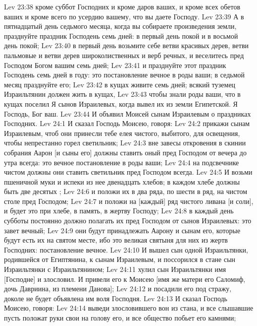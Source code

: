 \vs Lev 23:38 кроме суббот Господних и кроме даров ваших, и кроме всех обетов ваших и кроме всего  по усердию вашему, что вы даете Господу.
\vs Lev 23:39 А в пятнадцатый день седьмого месяца, когда вы собираете произведения земли, празднуйте праздник Господень семь дней: в первый день покой и в восьмой день покой;
\vs Lev 23:40 в первый день возьмите себе ветви красивых дерев, ветви пальмовые и ветви дерев широколиственных и верб речных, и веселитесь пред Господом Богом вашим семь дней;
\vs Lev 23:41 и празднуйте этот праздник Господень семь дней в году: это постановление вечное в роды ваши; в седьмой месяц празднуйте его;
\vs Lev 23:42 в кущах живите семь дней; всякий туземец Израильтянин должен жить в кущах,
\vs Lev 23:43 чтобы знали роды ваши, что в кущах поселил Я сынов Израилевых, когда вывел их из земли Египетской. Я Господь, Бог ваш.
\vs Lev 23:44 И объявил Моисей сынам Израилевым о праздниках Господних.
\vs Lev 24:1 И сказал Господь Моисею, говоря:
\vs Lev 24:2 прикажи сынам Израилевым, чтоб они принесли тебе елея чистого, выбитого, для освещения, чтобы непрестанно горел светильник;
\vs Lev 24:3 вне завесы  откровения в скинии собрания Аарон [и сыны его] должны ставить оный пред Господом от вечера до утра всегда: это вечное постановление в роды ваши;
\vs Lev 24:4 на подсвечнике чистом должны они ставить светильник пред Господом всегда.
\vs Lev 24:5 И возьми пшеничной муки и испеки из нее двенадцать хлебов; в каждом хлебе должны быть две десятых ;
\vs Lev 24:6 и положи их в два ряда, по шести в ряд, на чистом столе пред Господом;
\vs Lev 24:7 и положи на [каждый] ряд чистого ливана [и соли], и будет это при хлебе, в память, в жертву Господу;
\vs Lev 24:8 в каждый день субботы постоянно должно полагать их пред Господом от сынов Израилевых: это завет вечный;
\vs Lev 24:9 они будут принадлежать Аарону и сынам его, которые будут есть их на святом месте, ибо это великая святыня для них из жертв Господних:  постановление вечное.
\rsbpar\vs Lev 24:10 И вышел сын одной Израильтянки, родившейся от Египтянина, к сынам Израилевым, и поссорился в стане сын Израильтянки с Израильтянином;
\vs Lev 24:11 хулил сын Израильтянки имя [Господне] и злословил. И привели его к Моисею [имя же матери его Саломиф, дочь Давриина, из племени Данова];
\vs Lev 24:12 и посадили его под стражу, доколе не будет объявлена им воля Господня.
\rsbpar\vs Lev 24:13 И сказал Господь Моисею, говоря:
\vs Lev 24:14 выведи злословившего вон из стана, и все слышавшие пусть положат руки свои на голову его, и все общество побьет его камнями;
